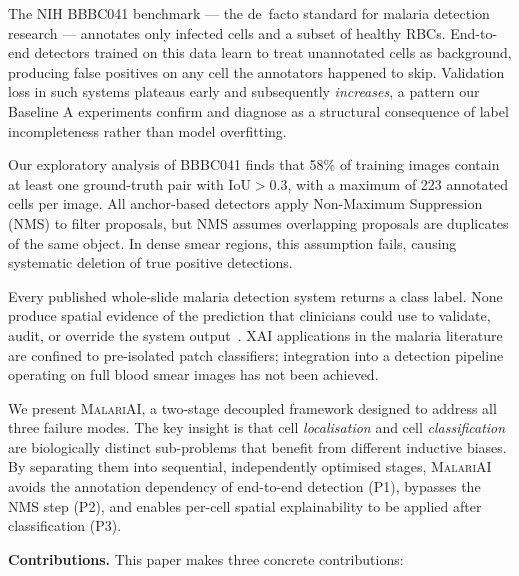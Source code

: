 \documentclass[review,12pt]{elsarticle}
\newcommand{\malariai}{\textsc{MalariAI}}
\begin{document}
\begin{description}[leftmargin=2em]
  \item[\textbf{P1 --- Incomplete Annotation.}] The NIH BBBC041 benchmark
  --- the de~facto standard for malaria detection research --- annotates
  only infected cells and a subset of healthy RBCs. End-to-end detectors
  trained on this data learn to treat unannotated cells as background,
  producing false positives on any cell the annotators happened to skip.
  Validation loss in such systems plateaus early and subsequently
  \emph{increases}, a pattern our Baseline A experiments confirm and
  diagnose as a structural consequence of label incompleteness rather than
  model overfitting.

  \item[\textbf{P2 --- Dense Overlap and NMS Failure.}] Our exploratory
  analysis of BBBC041 finds that 58\% of training images contain at least
  one ground-truth pair with $\text{IoU} > 0.3$, with a maximum of 223
  annotated cells per image. All anchor-based detectors apply Non-Maximum
  Suppression (NMS) to filter proposals, but NMS assumes overlapping
  proposals are duplicates of the same object. In dense smear regions, this
  assumption fails, causing systematic deletion of true positive detections.

  \item[\textbf{P3 --- Black-Box Output.}] Every published whole-slide
  malaria detection system returns a class label. None produce spatial
  evidence of the prediction that clinicians could use to validate,
  audit, or override the system output~\cite{selvaraju2017,chattopadhyay2018}.
  XAI applications in the malaria literature are confined to pre-isolated
  patch classifiers; integration into a detection pipeline operating on
  full blood smear images has not been achieved.
\end{description}

We present \malariai{}, a two-stage decoupled framework designed to address all three
failure modes. The key insight is that cell
\emph{localisation} and cell \emph{classification} are biologically
distinct sub-problems that benefit from different inductive biases.
By separating them into sequential, independently optimised stages,
\malariai{} avoids the annotation dependency of end-to-end detection
(P1), bypasses the NMS step (P2), and enables per-cell
spatial explainability to be applied after classification (P3).

\medskip
\noindent\textbf{Contributions.} This paper makes three concrete contributions:
\end{document}
